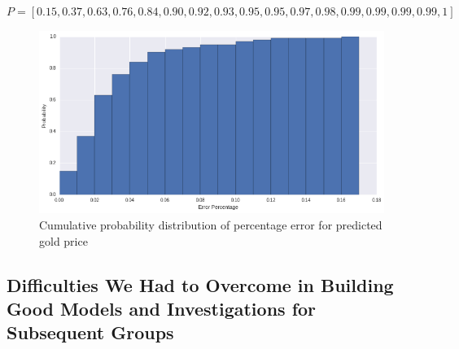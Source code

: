 \documentclass[runningheads]{llncs}
\begin{document}
\noindent $P = [0.15, 0.37, 0.63, 0.76, 0.84, 0.90, 0.92, 0.93, 0.95, 0.95, 0.97, 0.98, 0.99, 0.99, 0.99, 0.99, 1] $ \\

\begin{figure}
\centering
\includegraphics[width=\textwidth]{predict_gold.png}
\caption{Cumulative probability distribution of percentage error for predicted gold price}
\label{fig:predict_gold.png}
\end{figure}

\newpage
\subsection {Difficulties We Had to Overcome in Building Good Models and Investigations for Subsequent Groups}
\end{document}
